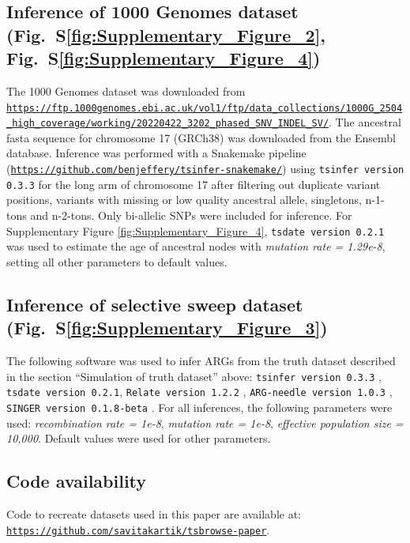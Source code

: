 \documentclass[unnumsec,webpdf,contemporary,large,namedate]{oup-authoring-template}
\begin{document}

\subsection{Inference of 1000 Genomes dataset (Fig.~S\ref{fig:Supplementary_Figure_2}, 
Fig.~S\ref{fig:Supplementary_Figure_4})} The 1000 Genomes dataset was downloaded from
\texttt{\url{https://ftp.1000genomes.ebi.ac.uk/vol1/ftp/data_collections/1000G_2504_high_coverage/working/20220422_3202_phased_SNV_INDEL_SV/}}.
The ancestral fasta sequence for chromosome 17 (GRCh38) was downloaded
from the Ensembl database. Inference was performed with a Snakemake pipeline
(\texttt{\url{https://github.com/benjeffery/tsinfer-snakemake/}}) using
\texttt{tsinfer version 0.3.3} for the long arm of chromosome 17 after
filtering out duplicate variant positions, variants with missing or low quality
ancestral allele, singletons, n-1-tons and n-2-tons. Only bi-allelic SNPs were
included for inference. For Supplementary Figure \ref{fig:Supplementary_Figure_4}, 
\texttt{tsdate version 0.2.1} was used to estimate the age of ancestral nodes
 with \textit{mutation rate = 1.29e-8}, setting all other parameters to default 
 values. 

\subsection{Inference of selective sweep dataset (Fig.~S\ref{fig:Supplementary_Figure_3})} 
The following software was used to infer ARGs from the truth dataset described in the
section ``Simulation of truth dataset'' above: 
\texttt{tsinfer version 0.3.3}
\citep{kelleher2019inferring}, \texttt{tsdate version 0.2.1}, 
\texttt{Relate version 1.2.2} \citep{speidel2019method}, 
\texttt{ARG-needle version 1.0.3} \citep{zhang2023biobank},
\texttt{SINGER version 0.1.8-beta} \citep{deng2024robust}.
For all inferences, the following parameters were used: \textit{recombination
    rate = 1e-8}, \textit{mutation rate = 1e-8}, \textit{effective population size
    = 10,000}. Default values were used for other parameters.

\subsection{Code availability} Code to recreate datasets used in this paper are available at:
\texttt{\url{https://github.com/savitakartik/tsbrowse-paper}}.
\end{document}
